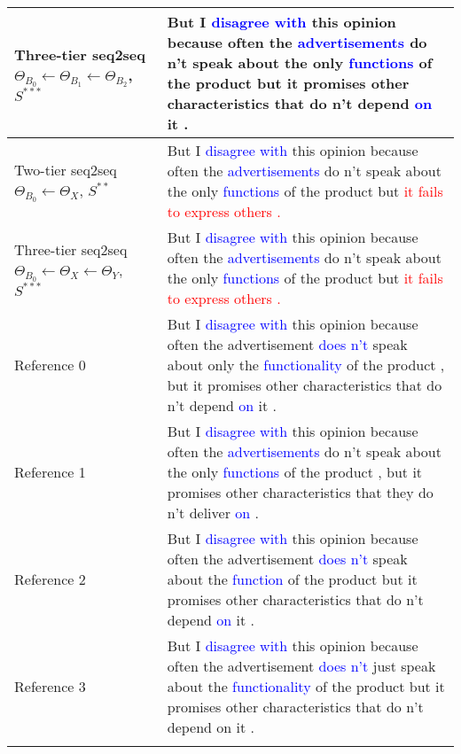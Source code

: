 \documentclass{standalone}
\begin{document}
\begin{landscape}
\begin{table}[t]
\begin{tabular}{p{6cm} p{13cm}  }
\hline
Three-tier seq2seq \(\Theta_{B_0}\leftarrow\Theta_{B_1}\leftarrow \Theta_{B_2}\), \(S^{***}\)		    
&But I \textcolor{blue}{disagree with} this opinion because often the \textcolor{blue}{advertisements} do n't speak about the only \textcolor{blue}{functions} of the product but it promises other characteristics that do n't depend \textcolor{blue}{on} it .   \\

\hline
Two-tier seq2seq  \(\Theta_{B_0}\leftarrow\Theta_{X}\), \(S^{**}\)			                     
&But I \textcolor{blue}{disagree with} this opinion because often the \textcolor{blue}{advertisements} do n't speak about the only \textcolor{blue}{functions} of the product but \textcolor{red}{it fails to express others .} \\

\hline
Three-tier seq2seq \(\Theta_{B_0}\leftarrow\Theta_{X}\leftarrow \Theta_{Y}\), 
\(S^{***}\)			
&But I \textcolor{blue}{disagree with} this opinion because often the \textcolor{blue}{advertisements} do n't speak about the only \textcolor{blue}{functions} of the product but \textcolor{red}{it fails to express others .} \\

\hline\hline
Reference 0	   &But I \textcolor{blue}{disagree with} this opinion because often the advertisement \textcolor{blue}{does n't} speak about only the \textcolor{blue}{functionality} of the product , but it promises other characteristics that do n't depend \textcolor{blue}{on} it .  \\

\hline
Reference 1	  &But I \textcolor{blue}{disagree with} this opinion because often the \textcolor{blue}{advertisements} do n't speak about the only \textcolor{blue}{functions} of the product , but it promises other characteristics that they do n't deliver \textcolor{blue}{on} .  \\

\hline
Reference 2	  &But I \textcolor{blue}{disagree with} this opinion because often the advertisement \textcolor{blue}{does n't} speak about the \textcolor{blue}{function} of the product but it promises other characteristics that do n't depend \textcolor{blue}{on} it .  \\

\hline
Reference 3	  &But I \textcolor{blue}{disagree with} this opinion because often the advertisement \textcolor{blue}{does n't} just speak about the \textcolor{blue}{functionality} of the product but it promises other characteristics that do n't depend on it .  \\
\noalign{\smallskip}\hline\hline\noalign{\smallskip}


\end{tabular}
\end{table}
\end{landscape}
\end{document}
